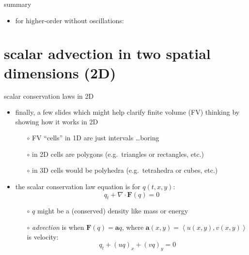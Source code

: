 \documentclass[10pt,hyperref,dvipsnames]{beamer}
\newcommand{\ba}{\mathbf{a}}
\newcommand{\bF}{\mathbf{F}}
\newcommand{\Div}{\nabla\cdot}
\begin{document}
\begin{frame}{summary}
\begin{itemize}
\begin{itemize}
\begin{itemize}
        \item for higher-order without oscillations:
        \end{itemize}
    \end{itemize}
\end{itemize}
\end{frame}


\section{scalar advection in two spatial dimensions (2D)}

\begin{frame}{scalar conservation laws in 2D}

\begin{itemize}
\item finally, a few slides which might help clarify finite volume (FV) thinking by showing how it works in 2D

    \begin{itemize}
    \item[$\circ$] FV ``cells'' in 1D are just intervals \dots boring
    \item[$\circ$] in 2D cells are polygons (e.g.~triangles or rectangles, etc.)
    \item[$\circ$] in 3D cells would be polyhedra (e.g.~tetrahedra or cubes, etc.)
    \end{itemize}

\item the scalar conservation law equation is for $q(t,x,y)$:
    $$q_t + \Div \bF(q) = 0$$

    \begin{itemize}
    \item[$\circ$] $q$ might be a (conserved) density like mass or energy
    \item[$\circ$] \emph{advection} is when $\bF(q) = \ba q$, where $\ba(x,y) = \left<u(x,y), v(x,y)\right>$ is velocity:
    $$q_t + (u q)_x + (v q)_y = 0$$
    \end{itemize}
\end{itemize}
\end{frame}
\end{document}

